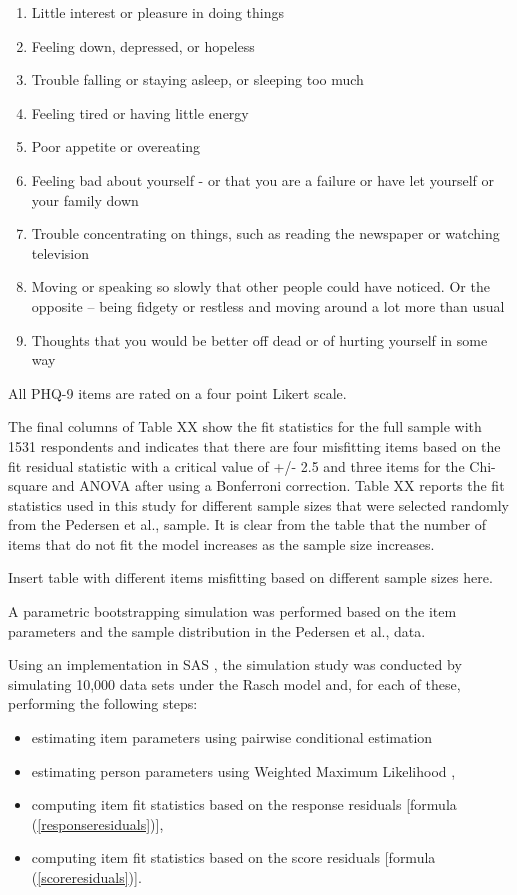 \documentclass{article}
\begin{document}
\begin{enumerate}
\item Little interest or pleasure in doing things
\item Feeling down, depressed, or hopeless
\item Trouble falling or staying asleep, or sleeping too much
\item Feeling tired or having little energy
\item Poor appetite or overeating
\item Feeling bad about yourself - or that you are a failure or have let yourself or your family down
\item Trouble concentrating on things, such as reading the newspaper or watching television
\item Moving or speaking so slowly that other people could have noticed. Or the opposite -- being fidgety or restless and moving around a lot more than usual
\item Thoughts that you would be better off dead or of hurting yourself in some way
\end{enumerate}

All PHQ-9 items are rated on a four point Likert scale.

The final columns of Table XX show the fit statistics for the full sample with 1531 respondents and indicates that there are four misfitting items based on the fit residual statistic with a critical value of +/- 2.5 and three items for the Chi-square and ANOVA after using a Bonferroni correction. Table XX reports the fit statistics used in this study for different sample sizes that were selected randomly from the Pedersen et al., sample. It is clear from the table that the number of items that do not fit the model increases as the sample size increases.

Insert table with different items misfitting based on different sample sizes here.

A parametric bootstrapping simulation was performed based on the item parameters and the sample distribution in the Pedersen et al., data.


Using an implementation in SAS \cite{christensen2006_SAS,Christensen2013}, the simulation study was conducted by simulating 10,000 data sets under the Rasch model and, for each of these, performing the following steps:


\begin{itemize}
\item[(i)] estimating item parameters using pairwise conditional estimation \cite{Zwinderman_1995,Andrich2003}
\item[(ii)] estimating person parameters using Weighted Maximum Likelihood \cite{warm},
\item[(iii)] computing item fit statistics based on the response residuals [formula (\ref{responseresiduals})],
\item[(iv)] computing item fit statistics based on the score residuals [formula (\ref{scoreresiduals})].
\end{itemize}
\end{document}
